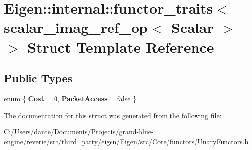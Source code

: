 \hypertarget{struct_eigen_1_1internal_1_1functor__traits_3_01scalar__imag__ref__op_3_01_scalar_01_4_01_4}{}\section{Eigen\+::internal\+::functor\+\_\+traits$<$ scalar\+\_\+imag\+\_\+ref\+\_\+op$<$ Scalar $>$ $>$ Struct Template Reference}
\label{struct_eigen_1_1internal_1_1functor__traits_3_01scalar__imag__ref__op_3_01_scalar_01_4_01_4}
\subsection*{Public Types}
\begin{DoxyCompactItemize}
\item 
\mbox{\label{struct_eigen_1_1internal_1_1functor__traits_3_01scalar__imag__ref__op_3_01_scalar_01_4_01_4_a81020f842b3de8dcca7e91b319d8b7c6}} 
enum \{ {\bfseries Cost} = 0, 
{\bfseries Packet\+Access} = false
 \}
\end{DoxyCompactItemize}


The documentation for this struct was generated from the following file\+:\begin{DoxyCompactItemize}
\item 
C\+:/\+Users/dante/\+Documents/\+Projects/grand-\/blue-\/engine/reverie/src/third\+\_\+party/eigen/\+Eigen/src/\+Core/functors/Unary\+Functors.\+h\end{DoxyCompactItemize}
